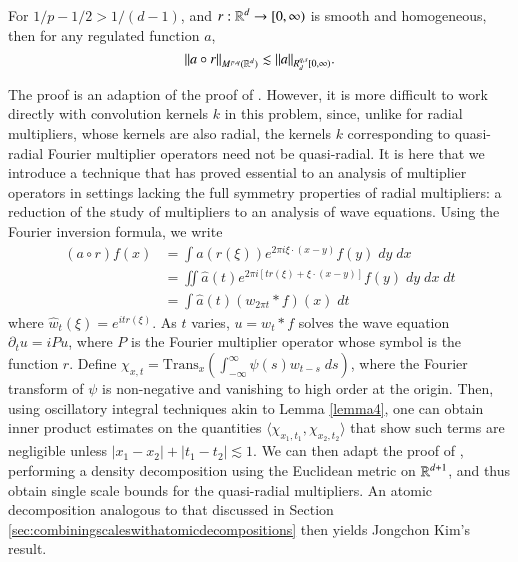 \begin{theorem}
  For $1/p - 1/2 > 1/(d - 1)$, and $r: \operatorname{\mathbb{R}}^d \to [0,\infty)$ is smooth and homogeneous, then for any regulated function $a$,
  \[ \| a \circ r \|_{M^{p,q}(\operatorname{\mathbb{R}}^d)} \lesssim \| a \|_{R^{q,s}_d[0,\infty)}. \]
\end{theorem}

The proof is an adaption of the proof of \cite{HeoandNazarovandSeeger2}. However, it is more difficult to work directly with convolution kernels $k$ in this problem, since, unlike for radial multipliers, whose kernels are also radial, the kernels $k$ corresponding to quasi-radial Fourier multiplier operators need not be quasi-radial. It is here that we introduce a technique that has proved essential to an analysis of multiplier operators in settings lacking the full symmetry properties of radial multipliers: a reduction of the study of multipliers to an analysis of wave equations. Using the Fourier inversion formula, we write
%
\begin{equation}
\begin{split}
  (a \circ r) f(x) &= \int a(r(\xi)) e^{2 \pi i \xi \cdot (x - y)} f(y)\; dy\; dx\\
  &= \iint \widehat{a}(t) e^{2 \pi i [t r(\xi) + \xi \cdot (x - y)]} f(y)\; dy\; dx\; dt\\
  &= \int \widehat{a}(t) (w_{2 \pi t} * f)(x)\; dt
\end{split}
\end{equation}
%
where $\widehat{w}_t(\xi) = e^{i t r(\xi)}$. As $t$ varies, $u = w_t * f$ solves the wave equation $\partial_t u = i P u$, where $P$ is the Fourier multiplier operator whose symbol is the function $r$. Define $\chi_{x,t} = \text{Trans}_x \left( \int_{-\infty}^\infty \psi(s) w_{t - s}\; ds \right)$, where the Fourier transform of $\psi$ is non-negative and vanishing to high order at the origin. Then, using oscillatory integral techniques akin to Lemma \ref{lemma4}, one can obtain inner product estimates on the quantities $\langle \chi_{x_1,t_1}, \chi_{x_2,t_2} \rangle$ that show such terms are negligible unless $|x_1 - x_2| + |t_1 - t_2| \lesssim 1$. We can then adapt the proof of \cite{HeoandNazarovandSeeger2}, performing a density decomposition using the Euclidean metric on $\operatorname{\mathbb{R}}^{d+1}$, and thus obtain single scale bounds for the quasi-radial multipliers. An atomic decomposition analogous to that discussed in Section \ref{sec:combiningscaleswithatomicdecompositions} then yields Jongchon Kim's result.

